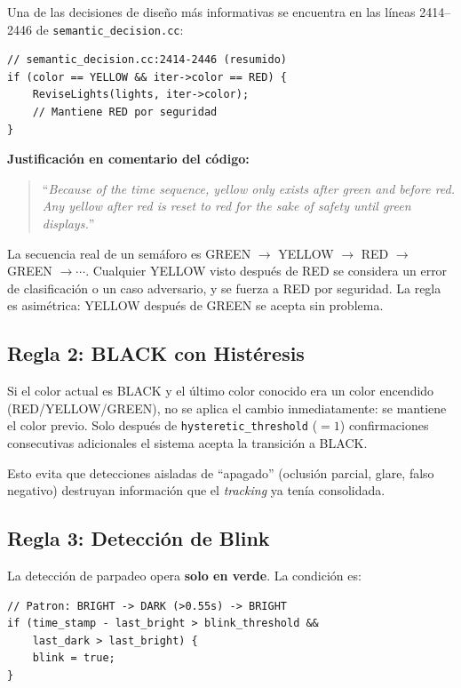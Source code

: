 Una de las decisiones de diseño más informativas se encuentra en las líneas 2414--2446 de \texttt{semantic\_decision.cc}:

\begin{codesnippet}
\begin{verbatim}
// semantic_decision.cc:2414-2446 (resumido)
if (color == YELLOW && iter->color == RED) {
    ReviseLights(lights, iter->color);
    // Mantiene RED por seguridad
}
\end{verbatim}
\end{codesnippet}

\textbf{Justificación en comentario del código:}
\begin{quote}
``\textit{Because of the time sequence, yellow only exists after green and before red. Any yellow after red is reset to red for the sake of safety until green displays.}''
\end{quote}

La secuencia real de un semáforo es GREEN $\to$ YELLOW $\to$ RED $\to$ GREEN $\to \cdots$. Cualquier YELLOW visto después de RED se considera un error de clasificación o un caso adversario, y se fuerza a RED por seguridad. La regla es asimétrica: YELLOW después de GREEN se acepta sin problema.

\subsection{Regla 2: BLACK con Histéresis}

Si el color actual es BLACK y el último color conocido era un color encendido (RED/YELLOW/GREEN), no se aplica el cambio inmediatamente: se mantiene el color previo. Solo después de \texttt{hysteretic\_threshold} ($= 1$) confirmaciones consecutivas adicionales el sistema acepta la transición a BLACK.

Esto evita que detecciones aisladas de ``apagado'' (oclusión parcial, glare, falso negativo) destruyan información que el \textit{tracking} ya tenía consolidada.

\subsection{Regla 3: Detección de Blink}

La detección de parpadeo opera \textbf{solo en verde}. La condición es:

\begin{codesnippet}
\begin{verbatim}
// Patron: BRIGHT -> DARK (>0.55s) -> BRIGHT
if (time_stamp - last_bright > blink_threshold &&
    last_dark > last_bright) {
    blink = true;
}
\end{verbatim}
\end{codesnippet}

